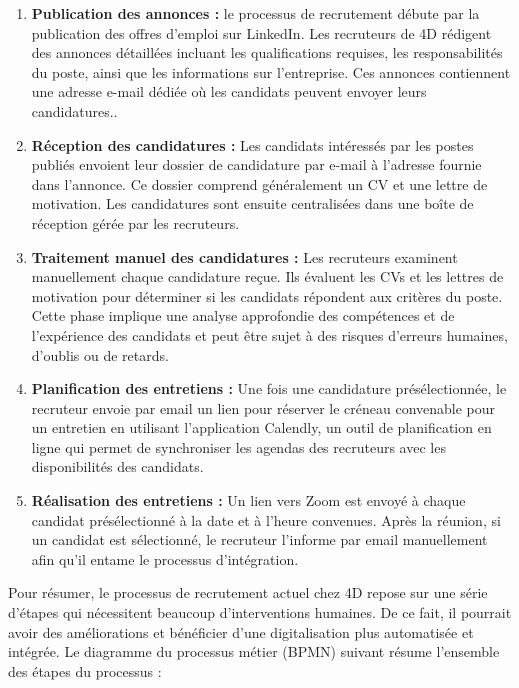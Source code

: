 \begin{enumerate}
   \item \textbf{Publication des annonces :} le processus de recrutement débute par la publication des offres d’emploi sur LinkedIn. Les recruteurs de 4D rédigent des annonces
   détaillées incluant les qualifications requises, les responsabilités du poste, ainsi que
   les informations sur l’entreprise. Ces annonces contiennent une adresse e-mail dédiée
   où les candidats peuvent envoyer leurs candidatures..
   \item \textbf{Réception des candidatures :} Les candidats intéressés par les postes publiés
   envoient leur dossier de candidature par e-mail à l’adresse fournie dans l’annonce. Ce
   dossier comprend généralement un CV et une lettre de motivation. Les candidatures
   sont ensuite centralisées dans une boîte de réception gérée par les recruteurs.
   
   \item \textbf{Traitement manuel des candidatures :} Les recruteurs examinent manuellement
   chaque candidature reçue. Ils évaluent les CVs et les lettres de motivation pour
   déterminer si les candidats répondent aux critères du poste. Cette phase implique
   une analyse approfondie des compétences et de l’expérience des candidats et peut
   être sujet à des risques d’erreurs humaines, d’oublis ou de retards.
   
   \item \textbf{Planification des entretiens :} 
   Une fois une candidature présélectionnée, le recruteur envoie par email un lien pour réserver le créneau convenable pour un entretien en utilisant l'application Calendly, un outil de planification en ligne qui permet de synchroniser les agendas des recruteurs avec les disponibilités des candidats.
   \item \textbf{Réalisation des entretiens :}  Un lien vers Zoom est envoyé à chaque candidat présélectionné à la date et à l’heure convenues. Après la réunion, si un candidat est sélectionné, le recruteur l'informe par email manuellement afin qu’il entame le processus d’intégration.
   
\end{enumerate}

Pour résumer, le processus de recrutement actuel chez 4D repose sur une série d’étapes qui
nécessitent beaucoup d’interventions humaines. De ce fait, il pourrait avoir des améliorations et bénéficier d’une digitalisation plus automatisée et intégrée. Le diagramme du processus métier (BPMN)
suivant résume l’ensemble des étapes du processus :

